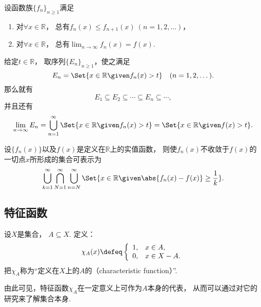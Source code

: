 \begin{example}
设函数族\(\{f_n\}_{n\geq1}\)满足
\begin{enumerate}
	\item 对\(\forall x\in\mathbb{R}\)，
	总有\(f_n(x) \leq f_{n+1}(x)\ (n=1,2,\dotsc)\)，
	\item 对\(\forall x\in\mathbb{R}\)，
	总有\(\lim_{n\to\infty} f_n(x) = f(x)\).
\end{enumerate}
给定\(t\in\mathbb{R}\)，
取序列\(\{E_n\}_{n\geq1}\)，使之满足\begin{equation*}
	E_n = \Set{ x\in\mathbb{R} \given f_n(x) > t }
	\quad(n=1,2,\dotsc).
\end{equation*}
那么就有\begin{equation*}
	E_1 \subseteq E_2 \subseteq \dotsb \subseteq E_n \subseteq \dotsb,
\end{equation*}
并且还有\begin{equation*}
	\lim_{n\to\infty} E_n
	= \bigcup_{n=1}^\infty \Set{ x\in\mathbb{R} \given f_n(x) > t }
	= \Set{ x\in\mathbb{R} \given f(x) > t }.
\end{equation*}
\end{example}

\begin{proposition}
设\(\{f_n(x)\}\)以及\(f(x)\)是定义在\(\mathbb{R}\)上的实值函数，
则使\(f_n(x)\)不收敛于\(f(x)\)的一切点\(x\)所形成的集合可表示为\begin{equation*}
	\bigcup_{k=1}^\infty
	\bigcap_{N=1}^\infty
	\bigcup_{n=N}^\infty
	\Set{
		x\in\mathbb{R}
		\given
		\abs{f_n(x) - f(x)} \geq \frac1k
	}.
\end{equation*}
\end{proposition}

\subsection{特征函数}
\begin{definition}
设\(X\)是集合，
\(A \subseteq X\).
定义：\begin{equation*}
	\chi_A(x)
	\defeq
	\left\{ \begin{array}{cl}
		1, & x \in A, \\
		0, & x \in X - A.
	\end{array} \right.
\end{equation*}
把\(\chi_A\)称为“定义在\(X\)上的\(A\)的（characteristic function）”.
\end{definition}
由此可见，特征函数\(\chi_A\)在一定意义上可作为\(A\)本身的代表，
从而可以通过对它的研究来了解集合本身.

